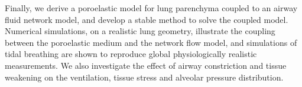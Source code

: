 Finally, we derive a poroelastic model for lung parenchyma coupled to an airway fluid network model, and develop a stable method to solve the coupled model.
%
Numerical simulations, on a realistic lung geometry, illustrate the coupling between the poroelastic medium and the network flow model, and simulations of tidal breathing are shown to reproduce global physiologically realistic measurements. We also investigate the effect of airway constriction and tissue weakening on the ventilation, tissue stress and alveolar pressure distribution.


\clearpage